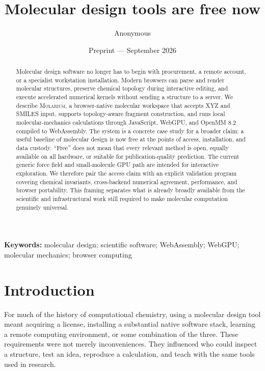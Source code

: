 \documentclass[11pt]{article}
\title{Molecular design tools are free now}
\author{Anonymous}
\date{Preprint --- September 2026}
\newcommand{\molarium}{\textsc{Molarium}}
\newif\ifdraft
\newcommand{\draftnote}[1]{%
  \ifdraft
    \par\noindent
    \colorbox{yellow!20}{%
      \parbox{\dimexpr\linewidth-2\fboxsep\relax}{%
        \textbf{Draft note:} #1%
      }%
    }%
    \par
  \fi
}
\begin{document}
\maketitle

\begin{abstract}
Molecular design software no longer has to begin with procurement, a remote
account, or a specialist workstation installation.
Modern browsers can parse and render molecular structures, preserve chemical
topology during interactive editing, and execute accelerated numerical kernels
without sending a structure to a server.
We describe \molarium, a browser-native molecular workspace that accepts XYZ and
SMILES input, supports topology-aware fragment construction, and runs local
molecular-mechanics calculations through JavaScript, WebGPU, and OpenMM 8.2
compiled to WebAssembly.
The system is a concrete case study for a broader claim: a useful baseline of
molecular design is now free at the points of access, installation, and data
custody.
``Free'' does not mean that every relevant method is open, equally available on
all hardware, or suitable for publication-quality prediction.
The current generic force field and small-molecule GPU path are intended for
interactive exploration.
We therefore pair the access claim with an explicit validation program covering
chemical invariants, cross-backend numerical agreement, performance, and browser
portability.
This framing separates what is already broadly available from the scientific and
infrastructural work still required to make molecular computation genuinely
universal.
\end{abstract}

\noindent\textbf{Keywords:}
molecular design; scientific software; WebAssembly; WebGPU; molecular mechanics;
browser computing

\draftnote{Replace the author metadata and decide whether this is primarily a
  software paper, a perspective, or an empirical access study. The present draft
  treats \molarium{} as a case study inside a broader position paper.}

\section{Introduction}
\label{sec:introduction}

For much of the history of computational chemistry, using a molecular design
tool meant acquiring a license, installing a substantial native software stack,
learning a remote computing environment, or some combination of the three.
These requirements were not merely inconveniences.
They influenced who could inspect a structure, test an idea, reproduce a
calculation, and teach with the same tools used in research.
\end{document}
